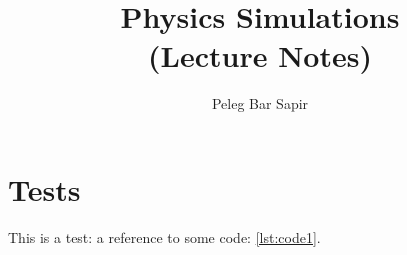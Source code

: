 \documentclass[a4paper, twoside, symmetric, nobib, nohyper]{tufte-book}
\title{Physics Simulations\\(Lecture Notes)}
\author{Peleg Bar Sapir}
\begin{document}
\maketitle

\ifdefined\testcode
  \chapter{Tests}
  This is a test: a reference to some code: \autoref{lst:code1}.
  
\else
\fi

\makeatletter
{}


% 
% 
% 
\makeatother
\end{document}
